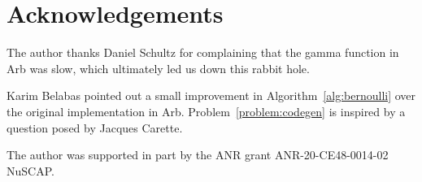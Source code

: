 \documentclass[reqno]{amsart}
\theoremstyle{definition}
\begin{document}
\section{Acknowledgements}

The author thanks Daniel Schultz for complaining that
the gamma function in Arb was slow, which ultimately led us down this rabbit hole.

Karim Belabas pointed out a small improvement in Algorithm~\ref{alg:bernoulli} over
the original implementation in Arb.
Problem~\ref{problem:codegen} is inspired by a question posed by Jacques Carette.

The author was supported in part by the ANR grant ANR-20-CE48-0014-02 NuSCAP.

%


\end{document}
